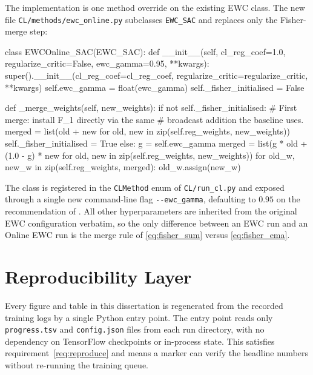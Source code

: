 The implementation is one method override on the existing
EWC class. The new file \texttt{CL/methods/ewc\_online.py}
subclasses \texttt{EWC\_SAC} and replaces only the
Fisher-merge step:

\begin{code}[language=Python, caption={Online EWC: an
    exponential moving average replaces the additive Fisher
    accumulation in the original \texttt{EWC\_SAC}.
    Excerpt from \texttt{CL/methods/ewc\_online.py}.},
    label={lst:ewconline}]
class EWCOnline_SAC(EWC_SAC):
    def __init__(self, cl_reg_coef=1.0, regularize_critic=False,
                 ewc_gamma=0.95, **kwargs):
        super().__init__(cl_reg_coef=cl_reg_coef,
                         regularize_critic=regularize_critic,
                         **kwargs)
        self.ewc_gamma = float(ewc_gamma)
        self._fisher_initialised = False

    def _merge_weights(self, new_weights):
        if not self._fisher_initialised:
            # First merge: install F_1 directly via the same
            # broadcast addition the baseline uses.
            merged = list(old + new for old, new in
                          zip(self.reg_weights, new_weights))
            self._fisher_initialised = True
        else:
            g = self.ewc_gamma
            merged = list(g * old + (1.0 - g) * new
                          for old, new in
                          zip(self.reg_weights, new_weights))
        for old_w, new_w in zip(self.reg_weights, merged):
            old_w.assign(new_w)
\end{code}

The class is registered in the \texttt{CLMethod} enum of
\texttt{CL/run\_cl.py} and exposed through a single new
command-line flag \texttt{-{}-ewc\_gamma}, defaulting to $0.95$
on the recommendation of \citet{schwarz2018progress}. All
other hyperparameters are inherited from the original EWC
configuration verbatim, so the only difference between an
EWC run and an Online EWC run is the merge rule of
\cref{eq:fisher_sum} versus \cref{eq:fisher_ema}.

\section{Reproducibility Layer}
\label{sec:reprod}

Every figure and table in this dissertation is regenerated from
the recorded training logs by a single Python entry point. The
entry point reads only \texttt{progress.tsv} and
\texttt{config.json} files from each run directory, with no
dependency on TensorFlow checkpoints or in-process state. This
satisfies requirement~\ref{req:reproduce} and means a marker can
verify the headline numbers without re-running the training
queue.


